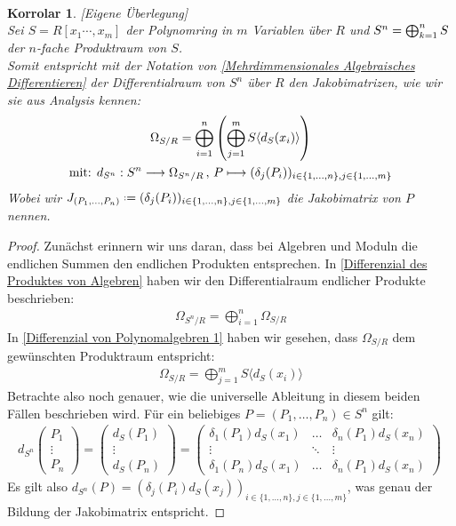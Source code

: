 \documentclass[10pt,a4paper]{report}
\newcounter{Aussage}[chapter]
\newtheorem{korrolar}[Aussage]{Korrolar}
\newcommand{\function}[5]{\nolinebreak{#1:#2 \longrightarrow #3 \, , \, #4 \longmapsto #5}}
\newcommand{\divR}[2]{\Omega_{#1/#2}}
\newcommand{\divf}[1]{d_{#1}}
\newcommand*{\defeq}{\mathrel{\vcenter{\baselineskip0.5ex \lineskiplimit0pt
                     \hbox{\scriptsize.}\hbox{\scriptsize.}}}%
                     =}
\begin{document}
\ \\
\begin{korrolar}\label{Jakobimatrizen}\textit{[Eigene Überlegung]}\\
Sei $S = R[x_1 \cdots , x_m]$ der Polynomring in $m$ Variablen über $R$ und $\nolinebreak{S^n = \bigoplus_{k = 1}^n S}$ der $n$-fache Produktraum von $S$.\\
Somit entspricht mit der Notation von \cref{Mehrdimmensionales Algebraisches Differentieren} der Differentialraum von $S^n$ über $R$ den Jakobimatrizen, wie wir sie aus Analysis kennen:
\begin{gather*}
\divR{S}{R} = \bigoplus_{i = 1}^n \left( \bigoplus_{j = 1}^m S\langle \divf{S}(x_i) \rangle \right)\\
\text{mit: } \function{\divf{S^n}}{S^n}{\divR{S^n}{R}}{P}{(\delta_j(P_i))_{i \in \lbrace 1 , \dots , n \rbrace , j \in \lbrace 1 , \dots , m \rbrace}}
\end{gather*}
Wobei wir $J_{(P_1, \dots ,P_n)} \defeq (\delta_j(P_i))_{i \in \lbrace 1 , \dots , n \rbrace , j \in \lbrace 1 , \dots , m \rbrace}$ die Jakobimatrix von $P$ nennen.
\end{korrolar}
\begin{proof}
Zunächst erinnern wir uns daran, dass bei Algebren und Moduln die endlichen Summen den endlichen Produkten entsprechen.
In \cref{Differenzial des Produktes von Algebren} haben wir den Differentialraum endlicher Produkte beschrieben:
\begin{gather*}
\divR{S^n}{R} = \bigoplus_{i=1}^n \divR{S}{R}
\end{gather*}
In \cref{Differenzial von Polynomalgebren 1} haben wir gesehen, dass $\divR{S}{R}$ dem gewünschten Produktraum entspricht:
\begin{gather*}
\divR{S}{R} = \bigoplus_{j = 1}^m S\langle \divf{S}(x_i) \rangle
\end{gather*}
Betrachte also noch genauer, wie die universelle Ableitung in diesem beiden Fällen beschrieben wird. Für ein beliebiges $P = (P_1, \dots , P_n) \in S^n$ gilt:
\begin{gather*}
\divf{S^n}
\begin{pmatrix}
P_1\\
\vdots\\
P_n
\end{pmatrix}
=
\begin{pmatrix}
\divf{S}(P_1)\\
\vdots\\
\divf{S}(P_n)
\end{pmatrix}
= 
\begin{pmatrix}
\delta_1(P_1) \divf{S}(x_1) & \dots & \delta_n(P_1) \divf{S}(x_n)\\
\vdots & \ddots & \vdots \\
\delta_1(P_n) \divf{S}(x_1) & \dots & \delta_n(P_1) \divf{S}(x_n)
\end{pmatrix}\
\end{gather*}
Es gilt also $\divf{S^n}(P) = (\delta_j(P_i)\divf{S}(x_j))_{i \in \lbrace 1 , \dots , n \rbrace , j \in \lbrace 1 , \dots , m \rbrace}$, was genau der Bildung der Jakobimatrix entspricht.
\end{proof}
\end{document}
